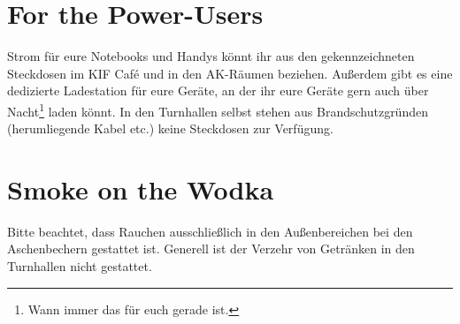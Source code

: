 \section*{For the Power-Users}

Strom für eure Notebooks und Handys könnt ihr aus den gekennzeichneten Steckdosen im KIF Café und in den AK-Räumen beziehen.
Außerdem gibt es eine dedizierte Ladestation für eure Geräte, an der ihr eure Geräte gern auch über Nacht\footnote{Wann immer das für euch gerade ist.} laden könnt.
In den Turnhallen selbst stehen aus Brandschutzgründen (herumliegende Kabel etc.) keine Steckdosen zur Verfügung.

\section*{Smoke on the Wodka}

Bitte beachtet, dass Rauchen ausschließlich in den Außenbereichen bei den Aschenbechern gestattet ist.
Generell ist der Verzehr von Getränken in den Turnhallen nicht gestattet.
